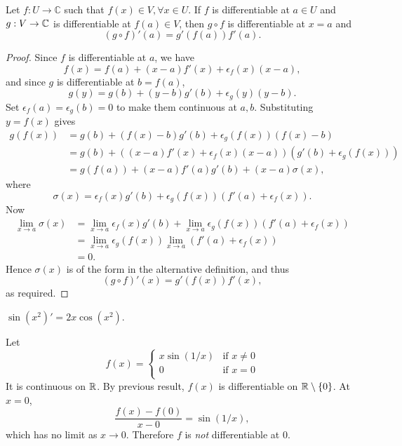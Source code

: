 \begin{theorem}\label{thm:Chain rule}
    Let $ f:U\to \mathbb{C}  $ such that $ f(x)\in V,\forall x\in U $. If $f$ is differentiable at $a\in U$ and $ g:V\to {\mathbb{C}} $ is differentiable at $f(a)\in V$, then $g\circ f$ is differentiable at $x=a$ and
    \[
        (g \circ f)'(a) = g'(f(a))f'(a).
    \]
\end{theorem}
\begin{proof}
    Since $f$ is differentiable at $a$, we have 
    \[
        f(x) = f(a) + (x-a) f'(x) +\epsilon_f(x)(x-a),
    \]
    and since $g$ is differentiable at $b=f(a)$, 
    \[
        g(y) = g(b) + (y-b) g'(b) + \epsilon_g(y) (y-b).
    \]
    Set $ \epsilon_f(a)=\epsilon_g(b)=0 $ to make them continuous at $a,b$. Substituting $y=f(x)$ gives 
    \begin{align*}
        g(f(x)) &= g(b) + (f(x)-b)g'(b)+\epsilon_g(f(x))(f(x)-b)\\ 
        &= g(b) + ((x-a)f'(x)+\epsilon_f(x)(x-a))(g'(b)+\epsilon_g(f(x))) \\ 
        &= g(f(a)) + (x-a) f'(a)g'(b)+(x-a)\sigma(x),
    \end{align*} 
    where
    \[
        \sigma(x) = \epsilon_f(x)g'(b)+\epsilon_g(f(x))(f'(a)+\epsilon_f(x)).
    \]
    Now 
    \begin{align*}
        \lim_{x \to a} \sigma(x) &= \lim_{x \to a}\epsilon_f(x)g'(b)+\lim_{x \to a}\epsilon_g(f(x))(f'(a)+\epsilon_f(x))\\ 
        &=\lim_{x \to a}\epsilon_g(f(x))\lim_{x \to a}(f'(a)+\epsilon_f(x))\\ 
        &= 0.
    \end{align*}
    Hence $ \sigma(x) $ is of the form in the alternative definition, and thus 
    \[
        (g \circ f)'(x)=g'(f(x))f'(x),
    \]
    as required.
\end{proof}
\begin{example}
    $ \sin (x^2)'=2x \cos (x^2) $.
\end{example}
\begin{example}
    Let 
    \[
        f(x) = \begin{cases}
        x\sin(1/x) &\text{if }x\neq 0\\
        0 &\text{if }x=0\\
        \end{cases} 
    \]
    It is continuous on ${\mathbb{R}}$. By previous result, $f(x)$ is differentiable on $ {\mathbb{R}}\setminus \{0\} $. At $x=0$, 
    \[
        \frac{f(x)-f(0)}{x-0} = \sin (1/x),
    \]
    which has no limit as $ x\to 0 $. Therefore $f$ is \textit{not} differentiable at $0$.
\end{example}
